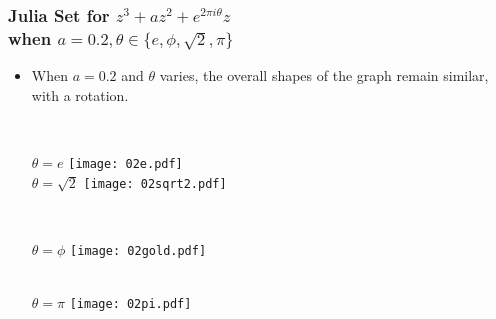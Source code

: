 \documentclass[leqno,handout]{beamer}
\begin{document}
\begin{frame} 
    
\frametitle{Julia Set for ${z^3 + a z^2 + e^{2 \pi i \theta} z}$ \\when ${a = 0.2, \theta \in \{e, \phi, \sqrt{2}, \pi\}}$}
\begin{itemize}

\item \small When ${a = 0.2}$ and ${\theta}$ varies, the overall shapes of the graph remain similar, with a rotation.
\\

\begin{column}{0.2\textwidth}
 \begin{center}
    \\${\theta = e}$
    \texttt{[image: 02e.pdf]}
    \\${\theta = \sqrt{2}}$
        \texttt{[image: 02sqrt2.pdf]}
        \end{center}
    
\end{column}
\begin{column}{0.2\textwidth}
\begin{center}
    \\${\theta = \phi}$
        \texttt{[image: 02gold.pdf]}
        \end{center}
        \begin{center}
    \\${\theta = \pi}$
    \texttt{[image: 02pi.pdf]}
        \end{center}
    
\end{column}   
\begin{column}{0.2\textwidth}
\end{column}        
\end{itemize}
\end{frame}
\end{document}
